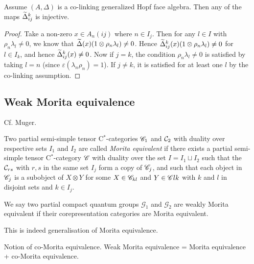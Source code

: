 \begin{Lem} Assume $(A,\Delta)$ is a co-linking generalized Hopf face algebra. Then any of the maps $\widetilde{\Delta}_{ij}^k$ is injective.\end{Lem}

\begin{proof} Take a non-zero $x\in A_n(ij)$ where $n\in I_j$. Then for any $l\in I$ with $\rho_n\lambda_l\neq 0$, we know that $\widetilde{\Delta}(x)(1\otimes \rho_n\lambda_l)\neq 0$. Hence $\widetilde{\Delta}_{ij}^k(x)(1\otimes \rho_n\lambda_l)\neq 0$ for $l\in I_k$, and hence $\widetilde{\Delta}_{ij}^k(x)\neq 0$. Now if $j=k$, the condition $\rho_n\lambda_l\neq 0$ is satisfied by taking $l=n$ (since $\varepsilon(\lambda_n\rho_n)=1$). If $j\neq k$, it is satisfied for at least one $l$ by the co-linking assumption.
\end{proof}


\subsection{Weak Morita equivalence}

Cf. Muger. 

\begin{Def} Two partial semi-simple tensor C$^*$-categories $\mathscr{C}_1$ and $\mathcal{C}_2$ with duality over respective sets $I_1$ and $I_2$ are called \emph{Morita equivalent} if there exists a partial semi-simple tensor C$^*$-category $\mathscr{C}$ with duality over the set $I=I_1\sqcup I_2$ such that the $\mathcal{C}_{rs}$ with $r,s$ in the same set $I_j$ form a copy of $\mathscr{C}_j$, and such that each object in $\mathscr{C}_{j}$ is a subobject of $X\otimes Y$ for some $X\in \mathscr{C}_{kl}$ and $Y\in \mathscr{C}{lk}$ with $k$ and $l$ in disjoint sets and $k\in I_j$. %

We say two partial compact quantum groups $\mathscr{G}_1$ and $\mathscr{G}_2$ are weakly Morita equivalent if their corepresentation categories are Morita equivalent. %
\end{Def} 

This is indeed generalisation of Morita equivalence. 

Notion of co-Morita equivalence. Weak Morita equivalence = Morita equivalence + co-Morita equivalence. 



